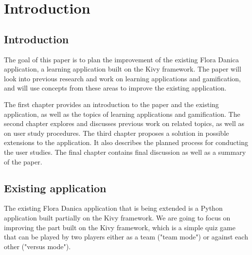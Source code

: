
\chapter{Introduction}

\label{Chapter1}



\section{Introduction}

The goal of this paper is to plan the improvement of the existing Flora Danica application, a learning application built on the Kivy framework\citep{Kivy}. The paper will look into previous research and work on learning applications and gamification, and will use concepts from these areas to improve the existing application.

The first chapter provides an introduction to the paper and the existing application, as well as the topics of learning applications and gamification. The second chapter explores and discusses previous work on related topics, as well as on user study procedures. The third chapter proposes a solution in possible extensions to the application. It also describes the planned process for conducting the user studies. The final chapter contains final discussion as well as a summary of the paper.


\section{Existing application}

The existing Flora Danica application that is being extended is a Python application built partially on the Kivy framework\citep{Kivy}. We are going to focus on improving the part built on the Kivy framework, which is a simple quiz game that can be played by two players either as a team ("team mode") or against each other ("versus mode").

